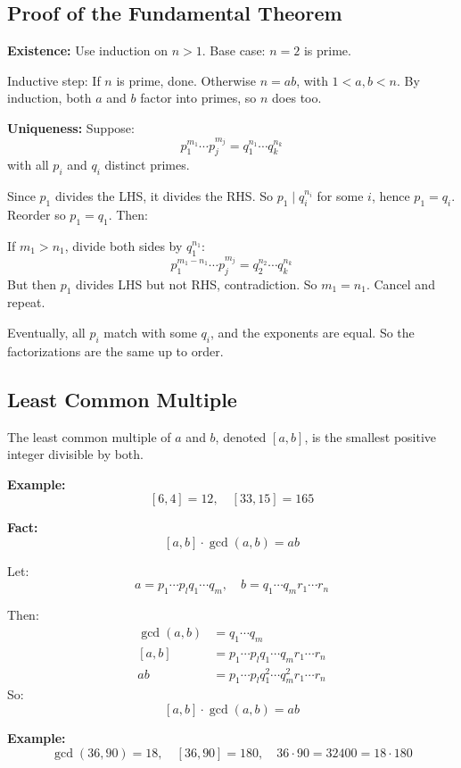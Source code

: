 \subsection{Proof of the Fundamental Theorem}

\textbf{Existence:}
Use induction on $n > 1$.
Base case: $n = 2$ is prime.

Inductive step: If $n$ is prime, done. Otherwise $n = ab$, with $1 < a, b < n$.
By induction, both $a$ and $b$ factor into primes, so $n$ does too.

\textbf{Uniqueness:}
Suppose:
\[
	p_1^{m_1} \cdots p_j^{m_j} = q_1^{n_1} \cdots q_k^{n_k}
\]
with all $p_i$ and $q_i$ distinct primes.

Since $p_1$ divides the LHS, it divides the RHS. So $p_1 \mid q_i^{n_i}$ for some $i$, hence $p_1 = q_i$.
Reorder so $p_1 = q_1$. Then:

If $m_1 > n_1$, divide both sides by $q_1^{n_1}$:
\[
	p_1^{m_1-n_1} \cdots p_j^{m_j} = q_2^{n_2} \cdots q_k^{n_k}
\]
But then $p_1$ divides LHS but not RHS, contradiction. So $m_1 = n_1$. Cancel and repeat.

Eventually, all $p_i$ match with some $q_i$, and the exponents are equal. So the factorizations are the same up to order.

\subsection{Least Common Multiple}

The least common multiple of $a$ and $b$, denoted $[a, b]$, is the smallest positive integer divisible by both.

\textbf{Example:}
\[
	[6, 4] = 12, \quad [33, 15] = 165
\]

\textbf{Fact:}
\[
	[a, b] \cdot \gcd(a, b) = ab
\]

Let:
\[
	a = p_1 \cdots p_lq_1 \cdots q_m, \quad b = q_1 \cdots q_mr_1 \cdots r_n
\]

Then:
\begin{align*}
	\gcd(a, b) & = q_1 \cdots q_m                                 \\
	[a, b]     & = p_1 \cdots p_lq_1 \cdots q_mr_1 \cdots r_n     \\
	ab         & = p_1 \cdots p_lq_1^2 \cdots q_m^2r_1 \cdots r_n
\end{align*}
So:
\[
	[a, b] \cdot \gcd(a, b) = ab
\]

\textbf{Example:}
\[
	\gcd(36, 90) = 18, \quad [36, 90] = 180, \quad 36 \cdot 90 = 32400 = 18 \cdot 180
\]

\newpage